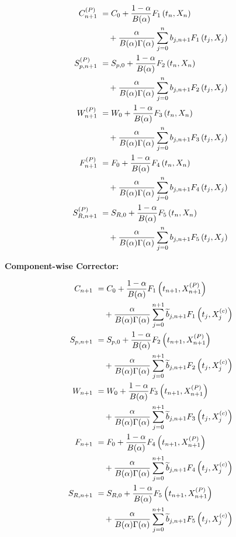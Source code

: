 \documentclass[10pt]{NSP1}
\newcommand{\fitwidth}[1]{\resizebox{\ifdim\width>\linewidth\linewidth\else\width\fi}{!}{#1}}
\begin{document}
\[
\fitwidth{$\displaystyle \begin{aligned}
C_{n + 1}^{(P)}\ &= C_{0} + \frac{1 - \alpha}{B(\alpha)}F_{1}\left( t_{n},X_{n} \right) \\
&\quad + \frac{\alpha}{B(\alpha)\Gamma(\alpha)}\sum_{j = 0}^{n}{}b_{j,n + 1}F_{1}\left( t_{j},X_{j} \right) \\
S_{p,n + 1}^{(P)}\ &= S_{p,0} + \frac{1 - \alpha}{B(\alpha)}F_{2}\left( t_{n},X_{n} \right) \\
&\quad + \frac{\alpha}{B(\alpha)\Gamma(\alpha)}\sum_{j = 0}^{n}{}b_{j,n + 1}F_{2}\left( t_{j},X_{j} \right) \\
W_{n + 1}^{(P)}\ &= W_{0} + \frac{1 - \alpha}{B(\alpha)}F_{3}\left( t_{n},X_{n} \right) \\
&\quad + \frac{\alpha}{B(\alpha)\Gamma(\alpha)}\sum_{j = 0}^{n}{}b_{j,n + 1}F_{3}\left( t_{j},X_{j} \right) \\
F_{n + 1}^{(P)}\ &= F_{0} + \frac{1 - \alpha}{B(\alpha)}F_{4}\left( t_{n},X_{n} \right) \\
&\quad + \frac{\alpha}{B(\alpha)\Gamma(\alpha)}\sum_{j = 0}^{n}{}b_{j,n + 1}F_{4}\left( t_{j},X_{j} \right) \\
S_{R,n + 1}^{(P)}\ &= S_{R,0} + \frac{1 - \alpha}{B(\alpha)}F_{5}\left( t_{n},X_{n} \right) \\
&\quad + \frac{\alpha}{B(\alpha)\Gamma(\alpha)}\sum_{j = 0}^{n}{}b_{j,n + 1}F_{5}\left( t_{j},X_{j} \right)\
\end{aligned}$}
\]

\textbf{Component-wise Corrector:}

\[
\fitwidth{$\displaystyle \begin{aligned}
C_{n + 1}\ &= C_{0} + \frac{1 - \alpha}{B(\alpha)}F_{1}\left( t_{n + 1},X_{n + 1}^{(P)} \right) \\
&\quad + \frac{\alpha}{B(\alpha)\Gamma(\alpha)}\sum_{j = 0}^{n + 1}{}{\widetilde{b}}_{j,n + 1}F_{1}\left( t_{j},X_{j}^{(c)} \right) \\
S_{p,n + 1}\ &= S_{p,0} + \frac{1 - \alpha}{B(\alpha)}F_{2}\left( t_{n + 1},X_{n + 1}^{(P)} \right) \\
&\quad + \frac{\alpha}{B(\alpha)\Gamma(\alpha)}\sum_{j = 0}^{n + 1}{}{\widetilde{b}}_{j,n + 1}F_{2}\left( t_{j},X_{j}^{(c)} \right) \\
W_{n + 1}\ &= W_{0} + \frac{1 - \alpha}{B(\alpha)}F_{3}\left( t_{n + 1},X_{n + 1}^{(P)} \right) \\
&\quad + \frac{\alpha}{B(\alpha)\Gamma(\alpha)}\sum_{j = 0}^{n + 1}{}{\widetilde{b}}_{j,n + 1}F_{3}\left( t_{j},X_{j}^{(c)} \right) \\
F_{n + 1}\ &= F_{0} + \frac{1 - \alpha}{B(\alpha)}F_{4}\left( t_{n + 1},X_{n + 1}^{(P)} \right) \\
&\quad + \frac{\alpha}{B(\alpha)\Gamma(\alpha)}\sum_{j = 0}^{n + 1}{}{\widetilde{b}}_{j,n + 1}F_{4}\left( t_{j},X_{j}^{(c)} \right) \\
S_{R,n + 1}\ &= S_{R,0} + \frac{1 - \alpha}{B(\alpha)}F_{5}\left( t_{n + 1},X_{n + 1}^{(P)} \right) \\
&\quad + \frac{\alpha}{B(\alpha)\Gamma(\alpha)}\sum_{j = 0}^{n + 1}{}{\widetilde{b}}_{j,n + 1}F_{5}\left( t_{j},X_{j}^{(c)} \right)\
\end{aligned}$}
\]
\end{document}
